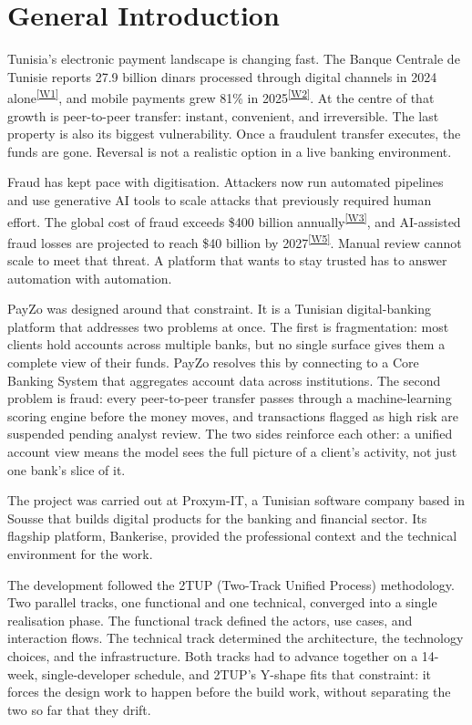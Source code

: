 \documentclass[12pt,a4paper]{report}
\newcommand{\webcite}[2]{\textsuperscript{\hyperref[#1]{[W#2]}}}
\begin{document}
\chapter*{General Introduction}

Tunisia's electronic payment landscape is changing fast. The Banque Centrale de Tunisie
reports 27.9 billion dinars processed through digital channels in 2024 alone\webcite{web:bct1}{1}, and mobile
payments grew 81\% in 2025\webcite{web:bct2}{2}. At the centre of that growth is peer-to-peer transfer: instant,
convenient, and irreversible. The last property is also its biggest vulnerability. Once a
fraudulent transfer executes, the funds are gone. Reversal is not a realistic option in a
live banking environment.

Fraud has kept pace with digitisation. Attackers now run automated pipelines and use
generative AI tools to scale attacks that previously required human effort. The global cost of
fraud exceeds \$400 billion annually\webcite{web:veriff}{3}, and AI-assisted fraud losses are projected to reach \$40
billion by 2027\webcite{web:deloitte}{5}. Manual review cannot scale to meet that threat. A platform that wants to stay
trusted has to answer automation with automation.

PayZo was designed around that constraint. It is a Tunisian digital-banking platform that
addresses two problems at once. The first is fragmentation: most clients hold accounts across
multiple banks, but no single surface gives them a complete view of their funds. PayZo resolves
this by connecting to a Core Banking System that aggregates account data across institutions.
The second problem is fraud: every peer-to-peer transfer passes through a machine-learning
scoring engine before the money moves, and transactions flagged as high risk are suspended
pending analyst review. The two sides reinforce each other: a unified account view means
the model sees the full picture of a client's activity, not just one bank's slice of it.

The project was carried out at Proxym-IT, a Tunisian software company based in Sousse that
builds digital products for the banking and financial sector. Its flagship platform, Bankerise,
provided the professional context and the technical environment for the work.

The development followed the 2TUP (Two-Track Unified Process) methodology. Two parallel
tracks, one functional and one technical, converged into a single realisation phase. The
functional track defined the actors, use cases, and interaction flows. The technical track
determined the architecture, the technology choices, and the infrastructure. Both tracks had
to advance together on a 14-week, single-developer schedule, and 2TUP's Y-shape fits that
constraint: it forces the design work to happen before the build work, without separating the
two so far that they drift.
\end{document}
